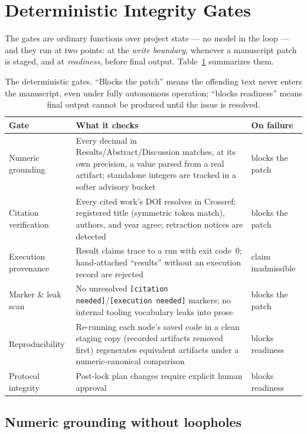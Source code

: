 \documentclass[11pt]{article}
\begin{document}
\section{Deterministic Integrity Gates}
\label{sec:gates}

The gates are ordinary functions over project state --- no model in the loop --- and they run at two points: at the \emph{write boundary}, whenever a manuscript patch is staged, and at \emph{readiness}, before final output. Table~\ref{tab:gates} summarizes them.

\begin{table}[t]
\centering
\small
\begin{tabular}{@{}p{}p{}p{}@{}}
\toprule
\textbf{Gate} & \textbf{What it checks} & \textbf{On failure} \\
\midrule
Numeric grounding & Every decimal in Results/Abstract/Discussion matches, at its own precision, a value parsed from a real artifact; standalone integers are tracked in a softer advisory bucket & blocks the patch \\
Citation verification & Every cited work's DOI resolves in Crossref; registered title (symmetric token match), authors, and year agree; retraction notices are detected & blocks the patch \\
Execution provenance & Result claims trace to a run with exit code~0; hand-attached ``results'' without an execution record are rejected & claim inadmissible \\
Marker \& leak scan & No unresolved \texttt{[citation needed]}/\texttt{[execution needed]} markers; no internal tooling vocabulary leaks into prose & blocks the patch \\
Reproducibility & Re-running each node's saved code in a clean staging copy (recorded artifacts removed first) regenerates equivalent artifacts under a numeric-canonical comparison & blocks readiness \\
Protocol integrity & Post-lock plan changes require explicit human approval & blocks readiness \\
\bottomrule
\end{tabular}
\caption{The deterministic gates. ``Blocks the patch'' means the offending text never enters the manuscript, even under fully autonomous operation; ``blocks readiness'' means final output cannot be produced until the issue is resolved.}
\label{tab:gates}
\end{table}

\subsection{Numeric grounding without loopholes}
\end{document}
